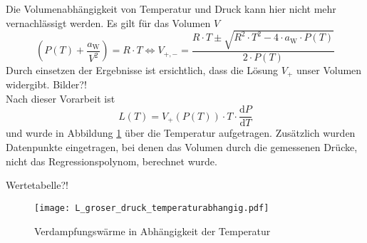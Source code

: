 Die Volumenabhängigkeit von Temperatur und Druck kann hier nicht mehr vernachlässigt werden. Es gilt für das Volumen $V$
\begin{equation}
\left( P(T) + \frac{a_\text{W}}{V^2}\right) = R \cdot T \Leftrightarrow
V_{+,-} = \frac{R \cdot T \pm \sqrt{R^2 \cdot T^2 - 4 \cdot a_\text{W} \cdot P(T)}}{2 \cdot P(T)}
\end{equation}
Durch einsetzen der Ergebnisse ist ersichtlich, dass die Lösung $V_+$ unser Volumen widergibt. 
Bilder?!
\\
Nach dieser Vorarbeit ist
\begin{equation}
L(T) = V_+(P(T)) \cdot T \cdot \frac{\text{d} P}{\text{d} T} 
\end{equation}
und wurde in Abbildung \ref{fig:L_groser_druck_temperaturabhangig} über die Temperatur aufgetragen. Zusätzlich wurden Datenpunkte eingetragen, bei denen das Volumen durch die gemessenen Drücke, nicht das Regressionspolynom, berechnet wurde. 

Wertetabelle?!



\begin{figure}[h!]
	\centering
	\texttt{[image: L\_groser\_druck\_temperaturabhangig.pdf]}
	\caption{Verdampfungswärme in Abhängigkeit der Temperatur}
	\label{fig:L_groser_druck_temperaturabhangig}
\end{figure}





